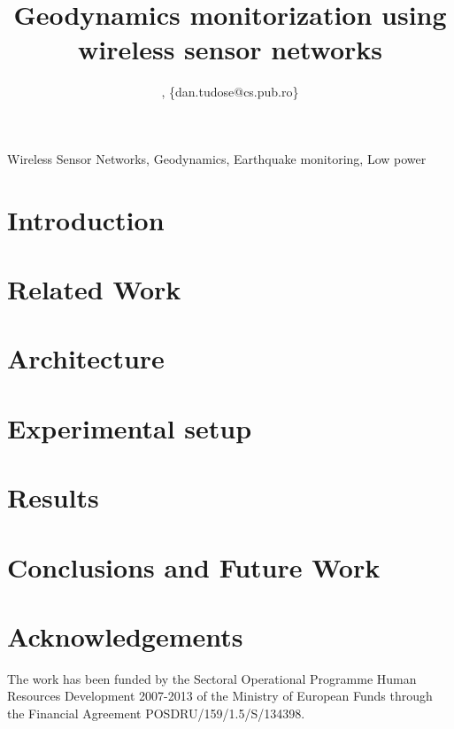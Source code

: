 \documentclass[conference]{IEEEtran}
\begin{document}
\title{Geodynamics monitorization using wireless sensor networks}

\author{
, \{dan.tudose@cs.pub.ro\}
}


 
\maketitle

\begin{abstract} 

\end{abstract}

\begin{IEEEkeywords}
Wireless Sensor Networks, Geodynamics, Earthquake monitoring, Low power
\end{IEEEkeywords}

\section{Introduction}
\label{sec:introduction}


\section{Related Work}
\label{sec:related}


\section{Architecture}
\label{sec:architecture}


\section{Experimental setup}
\label{sec:experimental}


\section{Results}
\label{sec:results}


\section{Conclusions and Future Work}
\label{sec:conclusion}


\section{Acknowledgements}
\label{sec:Acknowledgements}
The work has been funded by the Sectoral Operational Programme Human Resources Development 2007-2013 of the Ministry of European Funds through the Financial Agreement POSDRU/159/1.5/S/134398.



\end{document}
